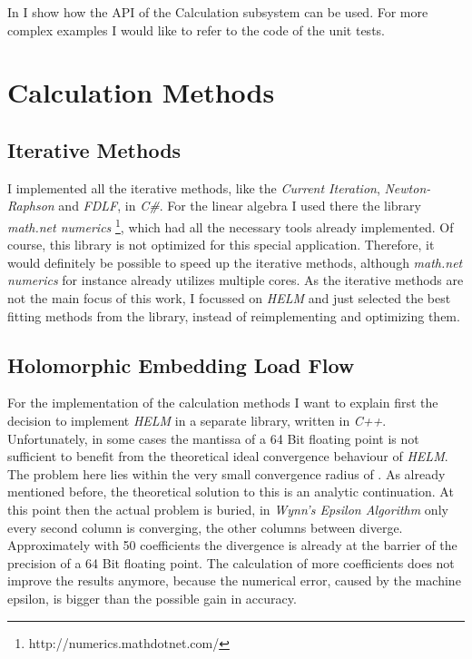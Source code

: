In  I show how the API of the Calculation subsystem can be used. For more complex examples I would like to refer to the code of the unit tests.

\section{Calculation Methods}
\label{sec:implementation_calculation_methods}

\subsection{Iterative Methods}
I implemented all the iterative methods, like the \emph{Current Iteration}, \emph{Newton-Raphson} and \emph{FDLF}, in \emph{C\#}. For the linear algebra I used there the library \emph{math.net numerics} \footnote{http://numerics.mathdotnet.com/}, which had all the necessary tools already implemented. Of course, this library is not optimized for this special application. Therefore, it would definitely be possible to speed up the iterative methods, although \emph{math.net numerics} for instance already utilizes multiple cores. As the iterative methods are not the main focus of this work, I focussed on \emph{HELM} and just selected the best fitting methods from the library, instead of reimplementing and optimizing them.

\subsection{Holomorphic Embedding Load Flow}
\label{sec:implementation_helm}
For the implementation of the calculation methods I want to explain first the decision to implement \emph{HELM} in a separate library, written in \emph{C++}. Unfortunately, in some cases the mantissa of a 64 Bit floating point is not sufficient to benefit from the theoretical ideal convergence behaviour of \emph{HELM}. The problem here lies within the very small convergence radius of . As already mentioned before, the theoretical solution to this is an analytic continuation. At this point then the actual problem is buried, in \emph{Wynn's Epsilon Algorithm} only every second column is converging, the other columns between diverge. Approximately with 50 coefficients the divergence is already at the barrier of the precision of a 64 Bit floating point. The calculation of more coefficients does not improve the results anymore, because the numerical error, caused by the machine epsilon, is bigger than the possible gain in accuracy.


